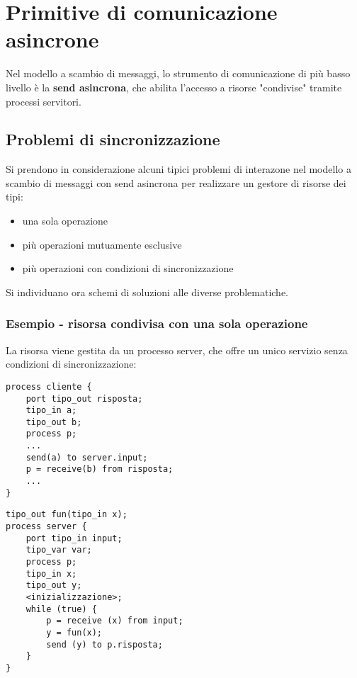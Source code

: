 \section{Primitive di comunicazione asincrone}

Nel modello a scambio di messaggi, lo strumento di comunicazione di più basso livello è la \textbf{send asincrona}, che abilita l'accesso a risorse "condivise" tramite processi servitori.

\subsection{Problemi di sincronizzazione}
Si prendono in considerazione alcuni tipici problemi di interazone nel modello a scambio di messaggi con send asincrona per realizzare un gestore di risorse dei tipi:
\begin{itemize}
    \item una sola operazione
    \item più operazioni mutuamente esclusive
    \item più operazioni con condizioni di sincronizzazione
\end{itemize}

Si individuano ora schemi di soluzioni alle diverse problematiche.

\subsubsection{Esempio - risorsa condivisa con una sola operazione}
La risorsa viene gestita da un processo server, che offre un unico servizio senza condizioni di sincronizzazione:
\begin{multicols}{2}
    \begin{verbatim}
process cliente {
    port tipo_out risposta;
    tipo_in a;
    tipo_out b;
    process p;
    ...
    send(a) to server.input;
    p = receive(b) from risposta;
    ...
}
    \end{verbatim}
    \columnbreak
    \begin{verbatim}
tipo_out fun(tipo_in x);
process server {
    port tipo_in input;
    tipo_var var;
    process p;
    tipo_in x;
    tipo_out y;
    <inizializzazione>;
    while (true) {
        p = receive (x) from input;
        y = fun(x);
        send (y) to p.risposta;
    }
}
    \end{verbatim}
\end{multicols}

